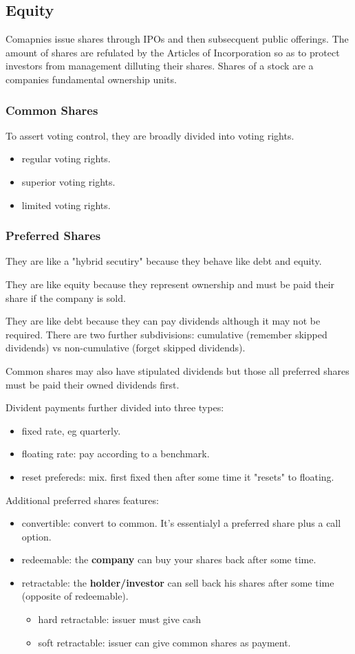 \documentclass{article}
\begin{document}
\subsection{Equity}
Comapnies issue shares through IPOs and then subsecquent public offerings. The amount of shares are refulated by the Articles of Incorporation so as to protect investors from management dilluting their shares. Shares of a stock are a companies fundamental ownership units. 

\subsubsection{Common Shares}
To assert voting control, they are broadly divided into voting rights.
\begin{itemize}
\item regular voting rights.
\item superior voting rights.
\item limited voting rights. 
\end{itemize}

\subsubsection{Preferred Shares}
They are like a "hybrid secutiry" because they behave like debt and equity. 

They are like equity because they represent ownership and must be paid their share if the company is sold. 

They are like debt because they can pay dividends although it may not be required. There are two further subdivisions: cumulative (remember skipped dividends) vs non-cumulative (forget skipped dividends).

Common shares may also have stipulated dividends but those all preferred shares must be paid their owned dividends first. 

Divident payments further divided into three types: \begin{itemize}
\item fixed rate, eg quarterly.
\item floating rate: pay according to a benchmark.
\item reset prefereds: mix. first fixed then after some time it "resets" to floating.
\end{itemize}

Additional preferred shares features: 
\begin{itemize}
\item convertible: convert to common. It's essentialyl a preferred share plus a call option. 
\item redeemable: the \textbf{company} can buy your shares back after some time.
\item retractable: the \textbf{holder/investor} can sell back his shares after some time (opposite of redeemable).
\begin{itemize}
\item hard retractable: issuer must give cash
\item soft retractable: issuer can give common shares as payment.
\end{itemize}
\end{itemize}
\end{document}
